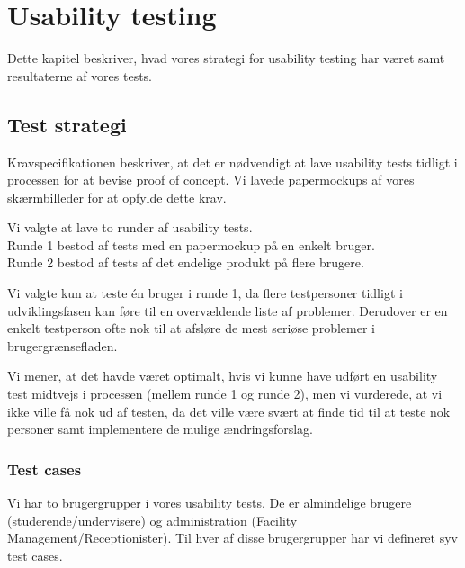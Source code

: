\chapter{Usability testing}
\label{Usability}
Dette kapitel beskriver, hvad vores strategi for usability testing har været samt resultaterne af vores tests.

\section{Test strategi}
\label{Usability_TS}
Kravspecifikationen beskriver, at det er nødvendigt at lave usability tests tidligt i processen for at bevise proof of concept. Vi lavede papermockups af vores skærmbilleder for at opfylde dette krav. 

Vi valgte at lave to runder af usability tests.
\\Runde 1 bestod af tests med en papermockup på en enkelt bruger.
\\Runde 2 bestod af tests af det endelige produkt på flere brugere.

Vi valgte kun at teste én bruger i runde 1, da flere testpersoner tidligt i udviklingsfasen kan føre til en overvældende liste af problemer\cite[s. 416]{SL_UID}. Derudover er en enkelt testperson ofte nok til at afsløre de mest seriøse problemer i brugergrænsefladen.

Vi mener, at det havde været optimalt, hvis vi kunne have udført en usability test midtvejs i processen (mellem runde 1 og runde 2), men vi vurderede, at vi ikke ville få nok ud af testen, da det ville være svært at finde tid til at teste nok personer samt implementere de mulige ændringsforslag.

\subsection{Test cases}
\label{Usability_TS_TC}
Vi har to brugergrupper i vores usability tests. De er almindelige brugere (studerende/undervisere) og administration (Facility Management/Receptionister). Til hver af disse brugergrupper har vi defineret syv test cases.


